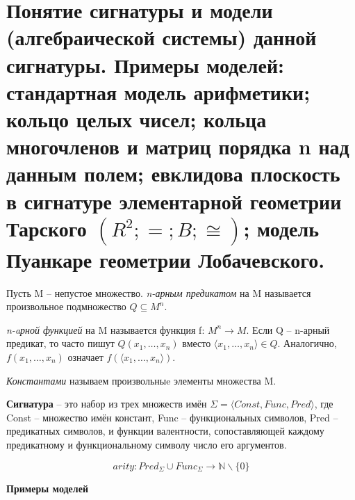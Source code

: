 \section{Понятие сигнатуры и модели (алгебраической системы) данной сигнатуры. Примеры моделей: стандартная модель
арифметики; кольцо целых чисел; кольца многочленов и матриц порядка n над данным полем; евклидова плоскость в
сигнатуре элементарной геометрии Тарского $(R^{2}; =; B; \cong)$; модель Пуанкаре геометрии Лобачевского.}

\begin{definition}
	Пусть M -- непустое множество. \textit{n-арным предикатом} на M называется произвольное подмножество $Q
	\subseteq M^{n}$.

	\textit{n-aрной функцией} на M называется функция f: $M^{n}\to M$.
	Если Q -- n-арный предикат, то часто пишут $Q(x_1, \ldots , x_n)$ вместо $\langle x_1, \ldots , x_n \rangle \in
	Q$. Аналогично, $f(x_1, \ldots , x_n)$ означает $f (\langle x_1, \ldots , x_n \rangle)$.

	\textit{Константами} называем произвольныe элементы множества M.

	\textbf{Сигнатура} -- это набор из трех множеств имён $\varSigma =  \langle Const, Func, Pred \rangle $, где
	Const -- множество имён констант, Func -- функциональных символов, Pred -- предикатных символов, и функции
	валентности, сопоставляющей каждому предикатному и функциональному символу число его
	аргументов.$\label{formula2}$

	$$arity : Pred_\Sigma \cup Func_\Sigma \rightarrow \mathbb{N} \backslash\{0\}$$
\end{definition}


\begin{center}
	\textbf{Примеры моделей}
\end{center}

